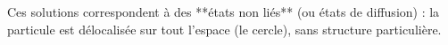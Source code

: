 Ces solutions correspondent à des **états non liés** (ou états de diffusion) : la particule est délocalisée sur tout l’espace (le cercle), sans structure particulière.





